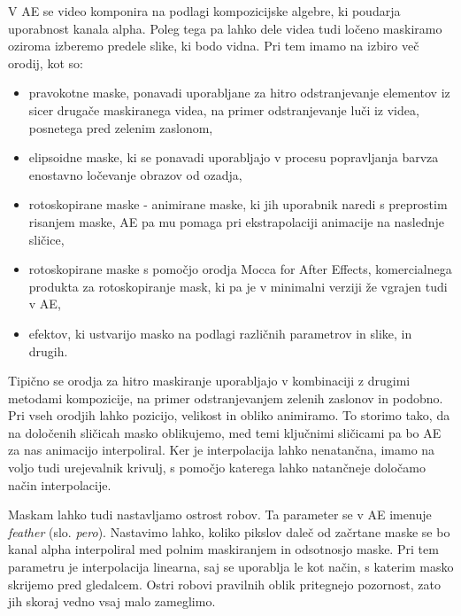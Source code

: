 \documentclass[a4paper, 12pt]{book}
\begin{document}
V AE se video komponira na podlagi kompozicijske algebre, ki poudarja uporabnost kanala alpha.
Poleg tega pa lahko dele videa tudi ločeno maskiramo oziroma izberemo predele slike, ki bodo vidna.
Pri tem imamo na izbiro več orodij, kot so:
\begin{itemize}
\item{pravokotne maske, ponavadi uporabljane za hitro odstranjevanje elementov iz sicer drugače maskiranega videa, na primer odstranjevanje luči iz videa, posnetega pred zelenim zaslonom,}
\item{elipsoidne maske, ki se ponavadi uporabljajo v procesu popravljanja barv\footnotemark za enostavno ločevanje obrazov od ozadja,}
\item{rotoskopirane maske - animirane maske, ki jih uporabnik naredi s preprostim risanjem maske, AE pa mu pomaga pri ekstrapolaciji animacije na naslednje sličice,}
\item{rotoskopirane maske s pomočjo orodja Mocca for After Effects, komercialnega produkta za rotoskopiranje mask, ki pa je v minimalni verziji že vgrajen tudi v AE,}
\item{efektov, ki ustvarijo masko na podlagi različnih parametrov in slike, in drugih.}
\end{itemize}

Tipično se orodja za hitro maskiranje uporabljajo v kombinaciji z drugimi metodami kompozicije, na primer odstranjevanjem zelenih zaslonov in podobno.
Pri vseh orodjih lahko pozicijo, velikost in obliko animiramo. 
To storimo tako, da na določenih sličicah masko oblikujemo, med temi ključnimi sličicami pa bo AE za nas animacijo interpoliral. 
Ker je interpolacija lahko nenatančna, imamo na voljo tudi urejevalnik krivulj, s pomočjo katerega lahko natančneje določamo način interpolacije.

Maskam lahko tudi nastavljamo ostrost robov.
Ta parameter se v AE imenuje {\it feather} (slo. {\it pero}).
Nastavimo lahko, koliko pikslov daleč od začrtane maske se bo kanal alpha interpoliral med polnim maskiranjem in odsotnosjo maske.
Pri tem parametru je interpolacija linearna, saj se uporablja le kot način, s katerim masko skrijemo pred gledalcem.
Ostri robovi pravilnih oblik pritegnejo pozornost, zato jih skoraj vedno vsaj malo zameglimo.

\end{document}
